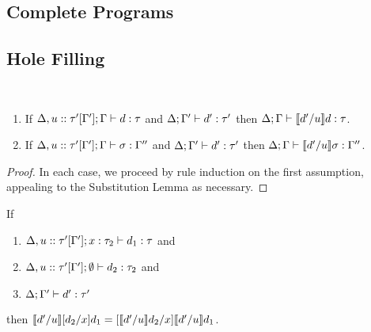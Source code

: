 
\clearpage
\subsection{Complete Programs}



\clearpage
\subsection{Hole Filling}\label{sec:hole-filling}


\begin{lem}[Filling] ~
  \begin{enumerate}[nolistsep]
  \item If $\Delta, u :: \tau'[\Gamma']; \Gamma \vdash d : \tau$
  and $\Delta; \Gamma' \vdash d' : \tau'$
  then $\Delta; \Gamma \vdash \llbracket d' / u\rrbracket d : \tau$.
  \item If $\Delta, u :: \tau'[\Gamma']; \Gamma \vdash \sigma : \Gamma''$
  and $\Delta; \Gamma' \vdash d' : \tau'$
  then $\Delta; \Gamma \vdash \llbracket d' / u\rrbracket \sigma : \Gamma''$.
  \end{enumerate}
\end{lem}
\begin{proof}
In each case, we proceed by rule induction on the first assumption, appealing to the Substitution Lemma as necessary.
\end{proof}

\begin{lem}
  If 
  \begin{enumerate}[nolistsep]
  	\item $\Delta, u :: \tau'[\Gamma']; x : \tau_2 \vdash d_1 : \tau$ and 
  	\item $\Delta, u :: \tau'[\Gamma']; \emptyset \vdash d_2 : \tau_2$ and 
  	\item $\Delta; \Gamma' \vdash d' : \tau'$
  \end{enumerate}

  then  $\llbracket d' / u\rrbracket [d_2/x]d_1 = [\llbracket d' / u\rrbracket d_2/x]\llbracket d' / u\rrbracket d_1$.
\end{lem}

